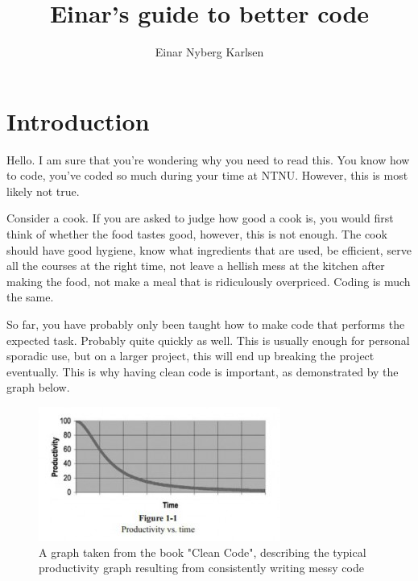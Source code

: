 \documentclass[10pt,a4paper]{article}
\title{Einar's guide to better code}
\author{Einar Nyberg Karlsen}
\begin{document}
\lstset{language=Python, 
		showstringspaces=false,
		basicstyle=\ttfamily\small}
		
\maketitle

\tableofcontents

\newpage

\section{Introduction}
Hello. I am sure that you're wondering why you need to read this. You know how to code, you've coded so much during your time at NTNU. However, this is most likely not true. 

Consider a cook. If you are asked to judge how good a cook is, you would first think of whether the food tastes good, however, this is not enough. The cook should have good hygiene, know what ingredients that are used, be efficient, serve all the courses at the right time, not leave a hellish mess at the kitchen after making the food, not make a meal that is ridiculously overpriced. Coding is much the same. 

So far, you have probably only been taught how to make code that performs the expected task. Probably quite quickly as well. This is usually enough for personal sporadic use, but on a larger project, this will end up breaking the project eventually. This is why having clean code is important, as demonstrated by the graph below.

\begin{center}
\begin{figure}[H]
\label{cleanCodeEfficiency}
\includegraphics[scale=1]{clean-code-productivity-300x166.jpg}
\caption{A graph taken from the book "Clean Code", describing the typical productivity graph resulting from consistently writing messy code} 
\end{figure}
\end{center}
\end{document}
